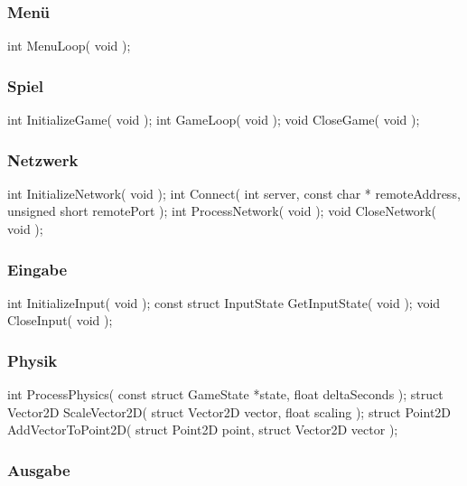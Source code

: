\documentclass{homework-pp}
\begin{document}
\subsubsection{Menü}

\begin{cblock}
int MenuLoop( void );
\end{cblock}

\subsubsection{Spiel}

\begin{cblock}
int InitializeGame( void );
int GameLoop( void );
void CloseGame( void );
\end{cblock}

\subsubsection{Netzwerk}

\begin{cblock}
int InitializeNetwork( void );
int Connect( int 			server,
			 const char *	remoteAddress,
			 unsigned short	remotePort );
int ProcessNetwork( void );
void CloseNetwork( void );
\end{cblock}

\subsubsection{Eingabe}

\begin{cblock}
int InitializeInput( void );
const struct InputState GetInputState( void );
void CloseInput( void );
\end{cblock}

\subsubsection{Physik}

\begin{cblock}
int ProcessPhysics( const struct GameState *state,
					float 					deltaSeconds );
struct Vector2D ScaleVector2D( struct Vector2D vector,
							   float 		   scaling );
struct Point2D AddVectorToPoint2D( struct Point2D  point,
								   struct Vector2D vector );
\end{cblock}

\subsubsection{Ausgabe}
\end{document}

